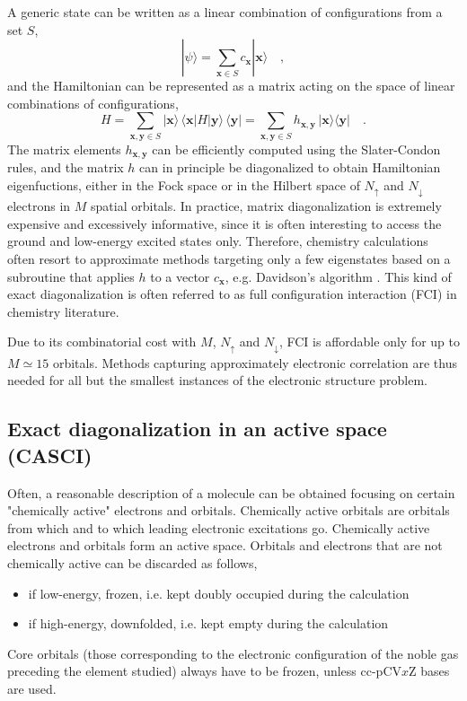 \documentclass{article}
\newcommand{\pos}[1]{\mathbf{#1}}
\begin{document}
A generic state can be written as a linear combination of configurations from a set $S$,
\begin{equation}
| \psi \rangle = \sum_{\pos{x} \in S} c_{\pos{x}} | \pos{x} \rangle
\quad,
\end{equation}
and the Hamiltonian can be represented as a matrix acting on the space of linear combinations of configurations,
\begin{equation}
H = \sum_{\pos{x},\pos{y} \in S} | \pos{x} \rangle \, \langle \pos{x} | H | \pos{y} \rangle \, \langle \pos{y} | = \sum_{\pos{x},\pos{y} \in S} h_{\pos{x},\pos{y}} \, | \pos{x} \rangle \langle \pos{y} |
\quad.
\end{equation}
The matrix elements $h_{\pos{x},\pos{y}}$ can be efficiently computed using the Slater-Condon rules, 
and the matrix $h$ can in principle be diagonalized to obtain Hamiltonian eigenfuctions, either in the Fock space or in the 
Hilbert space of $N_\uparrow$ and $N_\downarrow$ electrons in $M$ spatial orbitals.
In practice, matrix diagonalization is extremely expensive and excessively informative, since it is often interesting to access the ground and low-energy excited states only.
Therefore, chemistry calculations often resort to approximate methods targeting only a few eigenstates based on a subroutine that applies $h$ to a vector $c_{\pos{x}}$,
e.g. Davidson's algorithm \cite{davidson197514}. This kind of exact diagonalization is often referred to as full configuration interaction (FCI) in chemistry literature.

Due to its combinatorial cost with $M$, $N_\uparrow$ and $N_\downarrow$, FCI is affordable only for up to $M \simeq 15$ orbitals. 
Methods capturing approximately electronic correlation are thus needed for all but the smallest instances of the electronic structure problem.

\subsection{Exact diagonalization in an active space (CASCI)}

Often, a reasonable description of a molecule can be obtained focusing on certain "chemically active" electrons and orbitals. Chemically active orbitals are orbitals 
from which and to which leading electronic excitations go. Chemically active electrons and orbitals form an active space. Orbitals and electrons that are not chemically active can be discarded as follows,
\begin{itemize}
\item if low-energy, frozen, i.e. kept doubly occupied during the calculation
\item if high-energy, downfolded, i.e. kept empty during the calculation
\end{itemize}
Core orbitals (those corresponding to the electronic configuration of the noble gas preceding the element studied) always have to be frozen, unless cc-pCV$x$Z bases are used.
\end{document}
